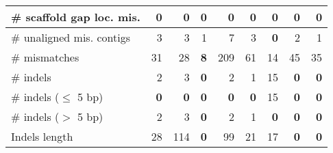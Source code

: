 \documentclass[12pt,a4paper]{article}
\begin{document}
\begin{table}[ht]
\begin{center}
\begin{tabular}{|l*{8}{|r}|}
\# scaffold gap loc. mis. & 0 & 0 & 0 & 0 & 0 & 0 & 0 & 0 \\ \hline
\# unaligned mis. contigs & 3 & 3 & 1 & 7 & 3 & {\bf 0} & 2 & 1 \\ \hline
\# mismatches & 31 & 28 & {\bf 8} & 209 & 61 & 14 & 45 & 35 \\ \hline
\# indels & 2 & 3 & {\bf 0} & 2 & 1 & 15 & {\bf 0} & {\bf 0} \\ \hline
\hspace{5mm}\# indels ($\leq$ 5 bp) & {\bf 0} & {\bf 0} & {\bf 0} & {\bf 0} & {\bf 0} & 15 & {\bf 0} & {\bf 0} \\ \hline
\hspace{5mm}\# indels ($>$ 5 bp) & 2 & 3 & {\bf 0} & 2 & 1 & {\bf 0} & {\bf 0} & {\bf 0} \\ \hline
Indels length & 28 & 114 & {\bf 0} & 99 & 21 & 17 & {\bf 0} & {\bf 0} \\ \hline
\end{tabular}
\end{center}
\end{table}
\end{document}
